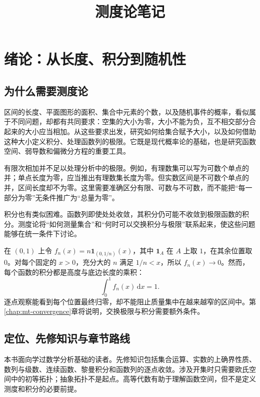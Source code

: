 \documentclass[UTF8,12pt,a4paper,fontset=fandol]{ctexbook}
\title{测度论笔记}
\author{}
\date{}
\begin{document}
\maketitle
\tableofcontents

\chapter{绪论：从长度、积分到随机性}
\label{chap:mt-introduction}

\section{为什么需要测度论}
区间的长度、平面图形的面积、集合中元素的个数，以及随机事件的概率，看似属于不同问题，却都有共同要求：空集的大小为零，大小不能为负，互不相交部分合起来的大小应当相加。从这些要求出发，研究如何给集合赋予大小，以及如何借助这种大小定义积分、处理函数列的极限。它既是现代概率论的基础，也是研究函数空间、弱导数和偏微分方程的重要工具。

有限次相加并不足以处理分析中的极限。例如，有理数集可以写为可数个单点的并；单点长度为零，应当推出有理数集长度为零。但实数区间是不可数个单点的并，区间长度却不为零。这里需要准确区分有限、可数与不可数，而不能把“每一部分为零”无条件推广为“总量为零”。

积分也有类似困难。函数列即使处处收敛，其积分仍可能不收敛到极限函数的积分。测度论将“如何测量集合”和“何时可以交换积分与极限”联系起来，使这些问题能够在统一条件下讨论。

\begin{example}[移动到小区间上的质量]
在 $(0,1)$ 上令 $f_n(x)=n\mathbf1_{(0,1/n)}(x)$，其中 $\mathbf1_A$ 在 $A$ 上取 $1$，在其余位置取 $0$。对每个固定的 $x>0$，充分大的 $n$ 满足 $1/n<x$，所以 $f_n(x)\to0$。然而，每个函数的积分都是高度与底边长度的乘积：
\[
 \int_0^1 f_n(x)\,\mathrm dx=1.
\]
逐点观察能看到每个位置最终归零，却不能阻止质量集中在越来越窄的区间中。第\ref{chap:mt-convergence}章将说明，交换极限与积分需要额外条件。
\end{example}

\section{定位、先修知识与章节路线}
本书面向学过数学分析基础的读者。先修知识包括集合运算、实数的上确界性质、数列与级数、连续函数、黎曼积分和函数列的逐点收敛。涉及开集时只需要欧氏空间中的初等拓扑；抽象拓扑不是起点。高等代数有助于理解函数空间，但不是定义测度和积分的必要前提。
\end{document}
